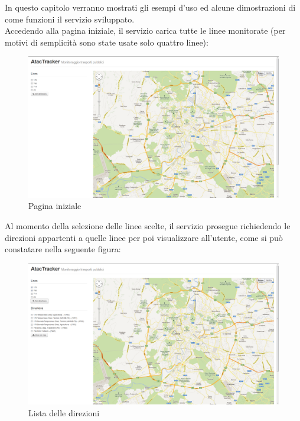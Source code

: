 In questo capitolo verranno mostrati gli esempi d'uso ed alcune dimostrazioni di come funzioni il servizio sviluppato.\\

Accedendo alla pagina iniziale, il servizio carica tutte le linee monitorate (per motivi di semplicità sono state usate solo quattro linee):
\vspace{1cm}
\begin{figure}[htbp]
\begin{center}
\includegraphics[width=13cm]{contents/images/home}
\end{center}
\caption{Pagina iniziale}
\label{fig:fermata}
\end{figure}

\newpage
Al momento della selezione delle linee scelte, il servizio prosegue richiedendo le direzioni appartenti a quelle linee per poi visualizzare all'utente, come si può constatare nella seguente figura:

\begin{figure}[htbp]
\begin{center}
\includegraphics[width=13cm]{contents/images/directions}
\end{center}
\caption{Lista delle direzioni}
\label{fig:fermata}
\end{figure}

